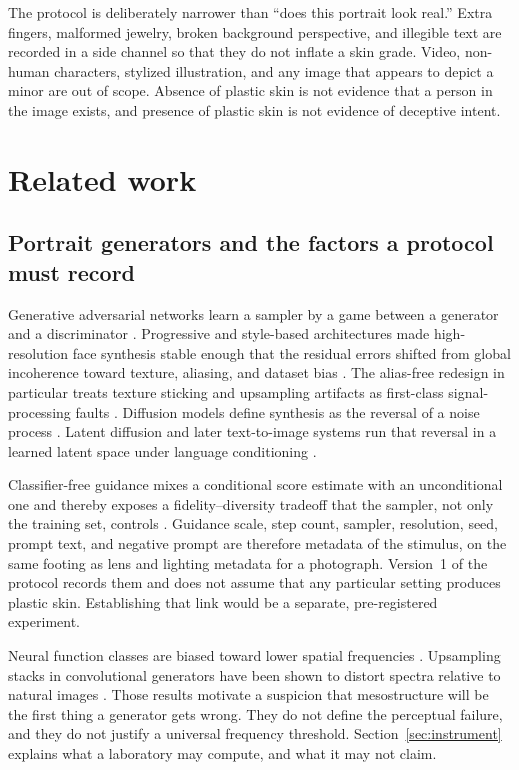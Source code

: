 \documentclass[10pt,twocolumn]{article}
\begin{document}
The protocol is deliberately narrower than ``does this portrait look real.'' Extra fingers, malformed jewelry, broken background perspective, and illegible text are recorded in a side channel so that they do not inflate a skin grade. Video, non-human characters, stylized illustration, and any image that appears to depict a minor are out of scope. Absence of plastic skin is not evidence that a person in the image exists, and presence of plastic skin is not evidence of deceptive intent.

\section{Related work}
\label{sec:related}

\subsection{Portrait generators and the factors a protocol must record}

Generative adversarial networks learn a sampler by a game between a generator and a discriminator \cite{goodfellow2014gan}. Progressive and style-based architectures made high-resolution face synthesis stable enough that the residual errors shifted from global incoherence toward texture, aliasing, and dataset bias \cite{karras2019stylegan,karras2020stylegan2,karras2021stylegan3}. The alias-free redesign in particular treats texture sticking and upsampling artifacts as first-class signal-processing faults \cite{karras2021stylegan3}. Diffusion models define synthesis as the reversal of a noise process \cite{ho2020ddpm}. Latent diffusion and later text-to-image systems run that reversal in a learned latent space under language conditioning \cite{rombach2022ldm,saharia2022imagen,podell2023sdxl}.

Classifier-free guidance mixes a conditional score estimate with an unconditional one and thereby exposes a fidelity--diversity tradeoff that the sampler, not only the training set, controls \cite{ho2022cfg}. Guidance scale, step count, sampler, resolution, seed, prompt text, and negative prompt are therefore metadata of the stimulus, on the same footing as lens and lighting metadata for a photograph. Version~1 of the protocol records them and does not assume that any particular setting produces plastic skin. Establishing that link would be a separate, pre-registered experiment.

Neural function classes are biased toward lower spatial frequencies \cite{rahaman2019spectral}. Upsampling stacks in convolutional generators have been shown to distort spectra relative to natural images \cite{durall2020upconv,frank2020freq,chandrasegaran2021}. Those results motivate a suspicion that mesostructure will be the first thing a generator gets wrong. They do not define the perceptual failure, and they do not justify a universal frequency threshold. Section~\ref{sec:instrument} explains what a laboratory may compute, and what it may not claim.
\end{document}
